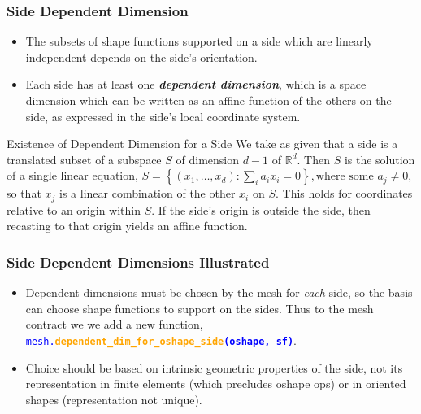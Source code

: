 \documentclass[compress]{beamer}
\begin{document}
\begin{frame}
  \frametitle{Side Dependent Dimension}
  \begin{itemize}[<+->]
  \item The subsets of shape functions supported on a side which are linearly independent depends on the side's orientation.
  \item Each side has at least one \emph{\textbf{dependent dimension}}, which is a space dimension which can be written as an affine
      function of the others on the side, as expressed in the side's local coordinate system.
  \end{itemize}
  \uncover<+-> {
    \begin{block}{Existence of Dependent Dimension for a Side}
      We take as given that a side is a translated subset of a subspace $S$ of dimension $d-1$ of $\mathbb{R}^d$. Then $S$ is the solution
      of a single linear equation, $S = \left\{(x_1,\dots,x_d): \sum_{i} a_i x_i = 0\right\}, \text{where some } a_j \ne 0$,
        so that $x_j$ is a linear combination of the other $x_i$ on $S$. This holds for coordinates relative to an origin within $S$.
        If the side's origin is outside the side, then recasting to that origin yields an affine function.
    \end{block}
  }
\end{frame}

\begin{frame}
  \frametitle{Side Dependent Dimensions Illustrated}
    \begin{itemize}[<+->]
      \item Dependent dimensions must be chosen by the mesh for \emph{each} side, so the basis can choose shape functions to support on the sides.
        Thus to the mesh contract we we add a new function,
        {\small \texttt{\textcolor{blue}{mesh.\textbf{\textcolor{orange}{dependent\_dim\_for\_oshape\_side}(oshape, sf)}}}}.
      \item Choice should be based on intrinsic geometric properties of the side, not its representation in finite elements
        (which precludes oshape ops) or in oriented shapes (representation not unique).
    \end{itemize}
\end{frame}
\end{document}
